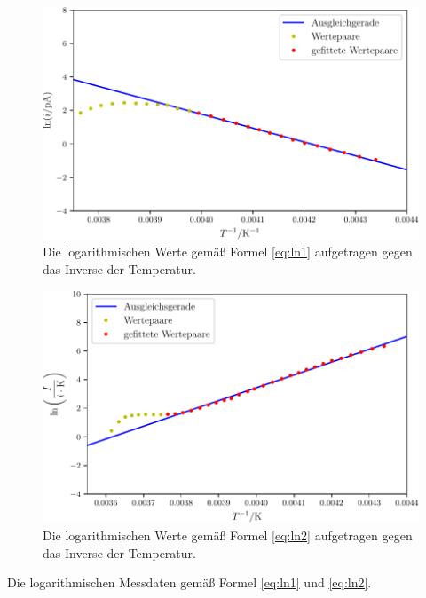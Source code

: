\begin{figure}
	\centering
	\includegraphics[width=\linewidth-60pt,height=\textheight-60pt,keepaspectratio]{content/images/W2_1.pdf}
	\caption{Die logarithmischen Werte gemäß Formel \eqref{eq:ln1} aufgetragen gegen das Inverse der Temperatur.}
	\label{fig:W2_1}
\end{figure}

\begin{figure}
	\centering
	\includegraphics[width=\linewidth-60pt,height=\textheight-60pt,keepaspectratio]{content/images/W2_2.pdf}
	\caption{Die logarithmischen Werte gemäß Formel \eqref{eq:ln2} aufgetragen gegen das Inverse der Temperatur.}
	\label{fig:W2_2}
\end{figure}

\begin{table}
\caption{Die logarithmischen Messdaten gemäß Formel \eqref{eq:ln1} und \eqref{eq:ln2}.}
\begin{minipage}[t]{0.5\textwidth}
	\centering
	
	\label{tab:dataW2_1}
\end{minipage}
\begin{minipage}[t]{0.5\textwidth}
	\centering
	
	\label{tab:dataW2_2}
\end{minipage}
\end{table}

